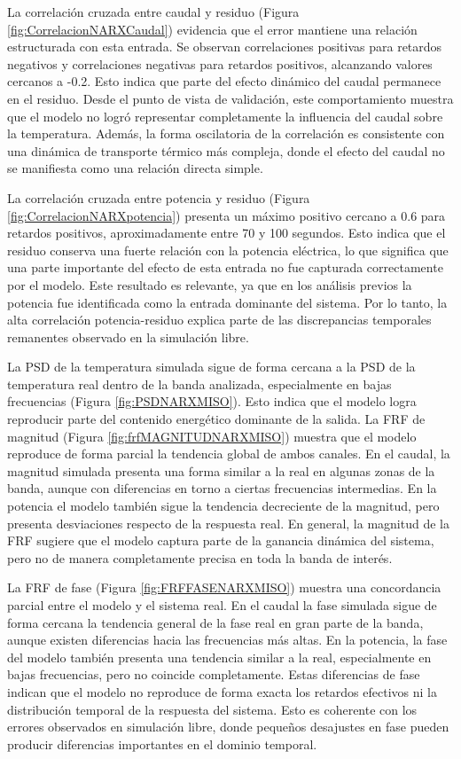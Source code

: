 \documentclass[11pt]{report}
\begin{document}
La correlación cruzada entre caudal y residuo (Figura \ref{fig:CorrelacionNARXCaudal}) evidencia que el error mantiene una relación estructurada con esta entrada. Se observan correlaciones positivas para retardos negativos y correlaciones negativas para retardos positivos, alcanzando valores cercanos a -0.2. Esto indica que parte del efecto dinámico del caudal permanece en el residuo. Desde el punto de vista de validación, este comportamiento muestra que el modelo no logró representar completamente la influencia del caudal sobre la temperatura. Además, la forma oscilatoria de la correlación es consistente con una dinámica de transporte térmico más compleja, donde el efecto del caudal no se manifiesta como una relación directa simple.

La correlación cruzada entre potencia y residuo (Figura \ref{fig:CorrelacionNARXpotencia}) presenta un máximo positivo cercano a 0.6 para retardos positivos, aproximadamente entre 70 y 100 segundos. Esto indica que el residuo conserva una fuerte relación con la potencia eléctrica, lo que significa que una parte importante del efecto de esta entrada no fue capturada correctamente por el modelo. Este resultado es relevante, ya que en los análisis previos la potencia fue identificada como la entrada dominante del sistema. Por lo tanto, la alta correlación potencia-residuo explica parte de las discrepancias temporales remanentes observado en la simulación libre.

La PSD de la temperatura simulada sigue de forma cercana a la PSD de la temperatura real dentro de la banda analizada, especialmente en bajas frecuencias (Figura \ref{fig:PSDNARXMISO}). Esto indica que el modelo logra reproducir parte del contenido energético dominante de la salida. 
La FRF de magnitud (Figura \ref{fig:frfMAGNITUDNARXMISO}) muestra que el modelo reproduce de forma parcial la tendencia global de ambos canales. En el caudal, la magnitud simulada presenta una forma similar a la real en algunas zonas de la banda, aunque con diferencias en torno a ciertas frecuencias intermedias. En la potencia el modelo también sigue la tendencia decreciente de la magnitud, pero presenta desviaciones respecto de la respuesta real. En general, la magnitud de la FRF sugiere que el modelo captura parte de la ganancia dinámica del sistema, pero no de manera completamente precisa en toda la banda de interés.

La FRF de fase (Figura \ref{fig:FRFFASENARXMISO}) muestra una concordancia parcial entre el modelo y el sistema real. En el caudal la fase simulada sigue de forma cercana la tendencia general de la fase real en gran parte de la banda, aunque existen diferencias hacia las frecuencias más altas. En la potencia, la fase del modelo también presenta una tendencia similar a la real, especialmente en bajas frecuencias, pero no coincide completamente. Estas diferencias de fase indican que el modelo no reproduce de forma exacta los retardos efectivos ni la distribución temporal de la respuesta del sistema. Esto es coherente con los errores observados en simulación libre, donde pequeños desajustes en fase pueden producir diferencias importantes en el dominio temporal.
\end{document}
